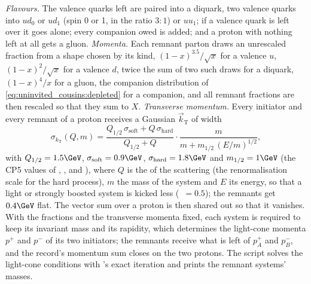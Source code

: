 \emph{Flavours.} The valence quarks left are paired into a diquark, two
valence quarks into $ud_0$ or $ud_1$ (spin 0 or 1, in the ratio $3:1$) or
$uu_1$; if a valence quark is left over it goes alone; every companion owed
is added; and a proton with nothing left at all gets a gluon. \emph{Momenta.}
Each remnant parton draws an unrescaled fraction from a shape chosen by its
kind, $(1-x)^{3.5}/\sqrt x$ for a valence $u$, $(1-x)^2/\sqrt x$ for a
valence $d$, twice the sum of two such draws for a diquark, $(1-x)^4/x$ for a
gluon, the companion distribution of \cref{eq:uninvited_cousins:depleted}
for a companion, and all remnant fractions are then rescaled so that they
sum to $X$. \emph{Transverse momentum.} Every initiator and every remnant
of a proton receives a Gaussian $\vec k_{\mathrm{T}}$ of width
\begin{equation}
  \sigma_{k_{\mathrm{T}}}(Q,m)=\frac{Q_{1/2}\,\sigma_{\mathrm{soft}}+Q\,\sigma_{\mathrm{hard}}}{Q_{1/2}+Q}\cdot\frac{m}{m+m_{1/2}\,(E/m)^{1/2}},
  \label{eq:uninvited_cousins:kt}
\end{equation}
with $Q_{1/2}=1.5\GeV$, $\sigma_{\mathrm{soft}}=0.9\GeV$,
$\sigma_{\mathrm{hard}}=1.8\GeV$ and $m_{1/2}=1\GeV$ (the CP5 values of
, ,
 and ), where $Q$ is the \pt of
the scattering (the renormalisation scale for the hard process), $m$ the
mass of the system and $E$ its energy, so that a light or strongly boosted
system is kicked less (~$=0.5$); the remnants get $0.4\GeV$ flat. The vector sum over a
proton is then shared out so that it vanishes. With the fractions and the transverse momenta fixed, each system
is required to keep its invariant mass and its rapidity, which determines
the light-cone momenta $p^+$ and $p^-$ of its two initiators; the remnants
receive what is left of $p^+_A$ and $p^-_B$, and the record's momentum sum
closes on the two protons. The script solves the light-cone conditions with
\PYTHIA's exact iteration and prints the remnant systems' masses.

